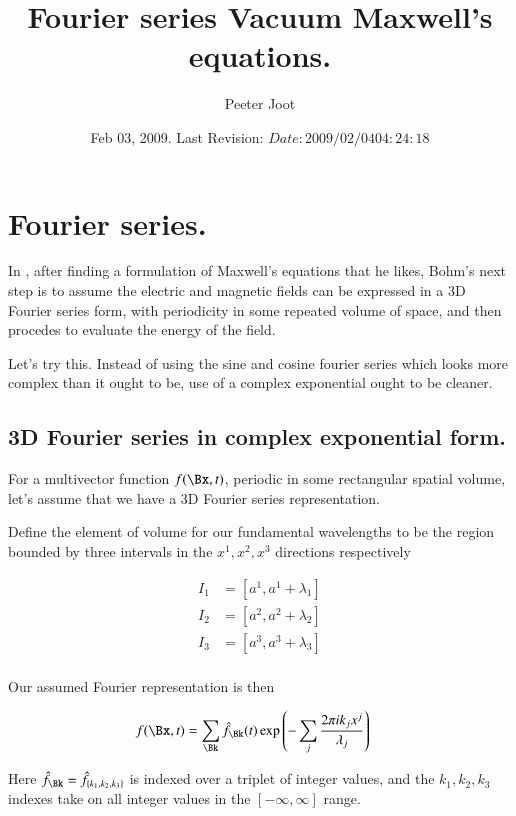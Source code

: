 \documentclass{article}
\title{ Fourier series Vacuum Maxwell's equations. }
\author{Peeter Joot}
\date{ Feb 03, 2009.  Last Revision: $Date: 2009/02/04 04:24:18 $ }
\begin{document}
\maketitle{}

\tableofcontents

\section{ Fourier series. }

In \cite{bohm1989qt}, 
after finding a formulation of Maxwell's equations that he likes, Bohm's next
step is to assume the electric and magnetic fields can be expressed in 
a 3D Fourier series form, with periodicity in some repeated volume 
of space, and then procedes to evaluate the energy of the 
field.

Let's try this.  Instead of using the sine and cosine fourier series
which looks more complex than it ought to be, use of a complex exponential
ought to be cleaner.

\subsection{ 3D Fourier series in complex exponential form. }

For a multivector function $f(\Bx, t)$, periodic in some rectangular spatial volume, let's assume that we have a
3D Fourier series representation.

Define the element of volume for our fundamental wavelengths to be the region bounded by three intervals in the $x^1, x^2, x^3$ directions respectively

\begin{align*}
I_1 &= [ a^1, a^1 + \lambda_1 ] \\
I_2 &= [ a^2, a^2 + \lambda_2 ] \\
I_3 &= [ a^3, a^3 + \lambda_3 ] \\
\end{align*}

Our assumed Fourier representation is then

\begin{align*}
f(\Bx, t) &= \sum_{\Bk} \hat{f}_{\Bk}(t) \exp\left( - \sum_j \frac{2 \pi i k_j x^j}{\lambda_j} \right)
\end{align*}

Here $\hat{f}_{\Bk} = \hat{f}_{\{k_1, k_2, k_3\}}$ is indexed over a triplet of integer values, and the $k_1, k_2, k_3$ indexes take on all integer values in the $[-\infty, \infty]$ range.
\end{document}
